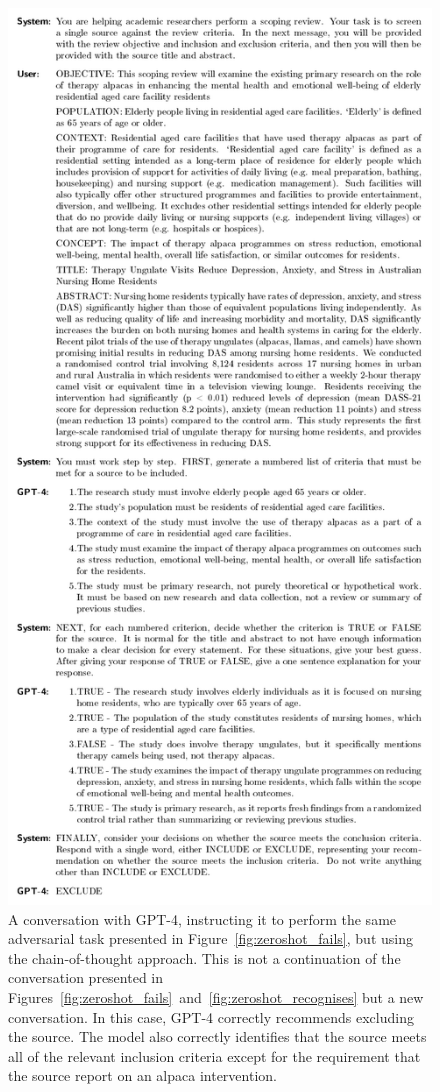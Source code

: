 \documentclass[10pt,a4paper,twocolumn]{article}
\begin{document}
\begin{figure}
\centering
  \includegraphics[width=\textwidth, height=0.85\textheight, keepaspectratio]{./fig_2c.pdf}
  \caption{A conversation with GPT-4, instructing it to perform the same adversarial task presented in Figure~\ref{fig:zeroshot_fails}, but using the chain-of-thought approach. This is not a continuation of the conversation presented in Figures~\ref{fig:zeroshot_fails}~and~\ref{fig:zeroshot_recognises} but a new conversation. In this case, GPT-4 correctly recommends excluding the source. The model also correctly identifies that the source meets all of the relevant inclusion criteria except for the requirement that the source report on an alpaca intervention.}
  \label{fig:cot_succeeds}
\end{figure}
\end{document}

